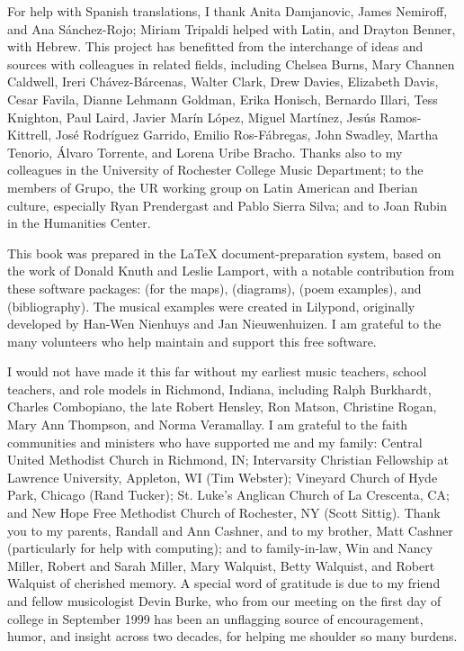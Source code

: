 For help with Spanish translations, I thank Anita Damjanovic, James Nemiroff,
and Ana Sánchez-Rojo; Miriam Tripaldi helped with Latin, and Drayton Benner,
with Hebrew.
This project has benefitted from the interchange of ideas and sources with
colleagues in related fields, including Chelsea Burns, Mary Channen Caldwell,
Ireri Chávez-Bárcenas, Walter Clark, Drew Davies, Elizabeth Davis, Cesar Favila,
Dianne Lehmann Goldman, Erika Honisch, Bernardo Illari, Tess Knighton, 
Paul Laird, Javier Marín López, Miguel Martínez, Jesús Ramos-Kittrell, José
Rodríguez Garrido, Emilio Ros-Fábregas, John Swadley, Martha Tenorio, 
Álvaro Torrente, and Lorena Uribe Bracho.
Thanks also to my colleagues in the University of Rochester College Music
Department; to the members of Grupo, the UR working group on Latin American
and Iberian culture, especially Ryan Prendergast and Pablo Sierra
Silva; and to Joan Rubin in the Humanities Center.

This book was prepared in the \LaTeX{} document-preparation system, based on
the work of Donald Knuth and Leslie Lamport, with a notable contribution from
these software packages:
 (for the maps),  (diagrams), 
(poem examples), and  (bibliography).
The musical examples were created in Lilypond, originally developed by Han-Wen
Nienhuys and Jan Nieuwenhuizen.
I am grateful to the many volunteers who help maintain and support this free
software.

I would not have made it this far without my earliest music teachers, school
teachers, and role models in Richmond, Indiana, including 
Ralph Burkhardt, 
Charles Combopiano, 
the late Robert Hensley, 
Ron Matson, 
Christine Rogan, 
Mary Ann Thompson,
and 
Norma Veramallay.
I am grateful to the faith communities and ministers who have supported me and
my family:
Central United Methodist Church in Richmond, IN; 
Intervarsity Christian Fellowship at Lawrence University, Appleton, WI (Tim
Webster); 
Vineyard Church of Hyde Park, Chicago (Rand Tucker); 
St. Luke's Anglican Church of La Crescenta, CA; 
and New Hope Free Methodist Church of Rochester, NY (Scott Sittig).
Thank you to my parents, Randall and Ann Cashner, and to
my brother, Matt Cashner (particularly for help with computing); and to
family-in-law, Win and Nancy Miller, Robert and Sarah Miller, Mary Walquist,
Betty Walquist, and Robert Walquist of cherished memory.
A special word of gratitude is due to my friend and fellow musicologist Devin
Burke, who from our meeting on the first day of college in September 1999 has
been an unflagging source of encouragement, humor, and insight across two
decades, for helping me shoulder so many burdens.

